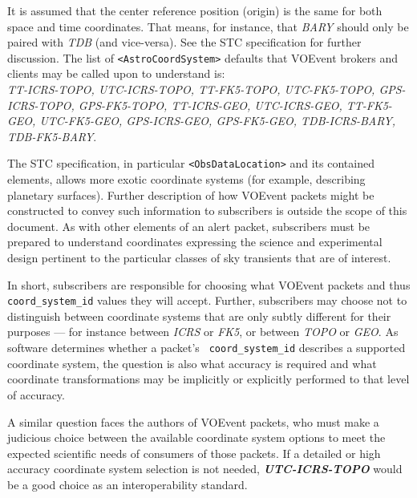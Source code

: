 \documentclass[11pt,a4paper]{ivoa}
\begin{document}
It is assumed that the center reference position (origin) is the same for both 
space and time coordinates. That means, for instance, that \emph{BARY} should 
only be paired with \emph{TDB} (and vice-versa). See the STC specification 
\citep{2007ivoa.spec.1030R} %
for further discussion. The list of {\tt <AstroCoordSystem>} defaults that 
VOEvent brokers and clients may be called upon to understand is: \\
\emph{TT-ICRS-TOPO, UTC-ICRS-TOPO, TT-FK5-TOPO, UTC-FK5-TOPO, GPS-ICRS-TOPO, 
GPS-FK5-TOPO, TT-ICRS-GEO, UTC-ICRS-GEO, TT-FK5-GEO, UTC-FK5-GEO, GPS-ICRS-GEO, 
GPS-FK5-GEO, TDB-ICRS-BARY, TDB-FK5-BARY}. 

The STC specification, in particular {\tt <ObsDataLocation>} and its contained 
elements, allows more exotic coordinate systems (for example, describing 
planetary surfaces). Further description of how VOEvent packets might be 
constructed to convey such information to subscribers is outside the scope of 
this document. As with other elements of an alert packet, subscribers must be 
prepared to understand coordinates expressing the science and experimental 
design pertinent to the particular classes of sky transients that are of 
interest. 

In short, subscribers are responsible for choosing what VOEvent packets and thus
{\tt coord\_system\_id} values they will accept. Further, subscribers may choose
not to distinguish between coordinate systems that are only subtly different for
their purposes --- for instance between \emph{ICRS} or \emph{FK5}, or between 
\emph{TOPO} or \emph{GEO}. As software determines whether a packet's {\tt 
coord\_system\_id} describes a supported coordinate system, the question is also
what accuracy is required and what coordinate transformations may be implicitly 
or explicitly performed to that level of accuracy. 

A similar question faces the authors of VOEvent packets, who must make a 
judicious choice between the available coordinate system options to meet the 
expected scientific needs of consumers of those packets. If a detailed or high 
accuracy coordinate system selection is not needed, \emph{\bf UTC-ICRS-TOPO} 
would be a good choice as an interoperability standard. 
\end{document}

